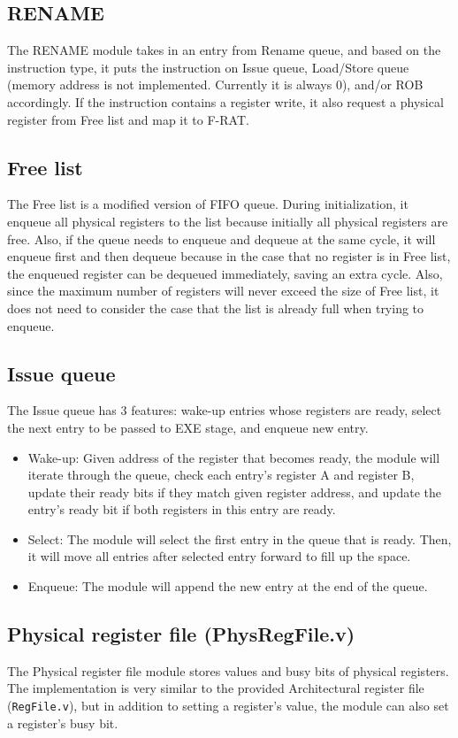 \documentclass[a4paper,11pt]{article}
\begin{document}
\subsection{RENAME}
The RENAME module takes in an entry from Rename queue, and based on the instruction type, it puts the instruction on Issue queue, Load/Store queue (memory address is not implemented. Currently it is always 0), and/or ROB accordingly. If the instruction contains a register write, it also request a physical register from Free list and map it to F-RAT.

\subsection{Free list}
The Free list is a modified version of FIFO queue. During initialization, it enqueue all physical registers to the list because initially all physical registers are free. Also, if the queue needs to enqueue and dequeue at the same cycle, it will enqueue first and then dequeue because in the case that no register is in Free list, the enqueued register can be dequeued immediately, saving an extra cycle. Also, since the maximum number of registers will never exceed the size of Free list, it does not need to consider the case that the list is already full when trying to enqueue.

\subsection{Issue queue}
The Issue queue has 3 features: wake-up entries whose registers are ready, select the next entry to be passed to EXE stage, and enqueue new entry.
\begin{itemize}
  \item Wake-up: Given address of the register that becomes ready, the module will iterate through the queue, check each entry's register A and register B, update their ready bits if they match given register address, and update the entry's ready bit if both registers in this entry are ready.
  \item Select: The module will select the first entry in the queue that is ready. Then, it will move all entries after selected entry forward to fill up the space.
  \item Enqueue: The module will append the new entry at the end of the queue.
\end{itemize}

\subsection{Physical register file (PhysRegFile.v)}
The Physical register file module stores values and busy bits of physical registers. The implementation is very similar to the provided Architectural register file (\texttt{RegFile.v}), but in addition to setting a register's value, the module can also set a register's busy bit.
\end{document}
